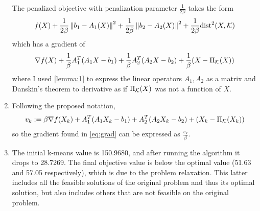 \documentclass{article}
\begin{document}
\begin{enumerate}[label=(\alph*)]
    The penalized objective with penalization parameter $\frac{1}{2\beta}$ takes the form
    \begin{align}
        f(X)+\frac{1}{2\beta}\left\lVert b_1-A_1(X)\right\rVert^2+\frac{1}{2\beta}\left\lVert b_2-A_2(X)\right\rVert^2+\frac{1}{2\beta}\text{dist}^2(X,\mathcal{K})
    \end{align}
    which has a gradient of
    \begin{align}
        \nabla f(X) +\frac{1}{\beta}A_1^T(A_1X -b_1)+\frac{1}{\beta}A_2^T(A_2X-b_2)+\frac{1}{\beta}(X - \Pi_{\mathcal{K}}(X))
        \label{eq:grad}
    \end{align}
    where I used \autoref{lemma:1} to express the linear operators $A_1,A_2$ as a matrix and Danskin's theorem to derivative as if $\Pi_{\mathcal{K}}(X)$ was not a function of $X$.
    \item Following the proposed notation,
    \begin{align}
        v_k := \beta \nabla f(X_k) +A_1^T(A_1X_k -b_1)+A_2^T(A_2X_k-b_2)+(X_k - \Pi_{\mathcal{K}}(X_k))
    \end{align}
    so the gradient found in \eqref{eq:grad} can be expressed as $\frac{v_k}{\beta}$.
    \item The initial k-means value is 150.9680, and after running the algorithm it drops to 28.7269. The final objective value is below the optimal value (51.63 and 57.05 respectively), which is due to the problem relaxation. This latter includes all the feasible solutions of the original problem and thus its optimal solution, but also includes others that are not feasible on the original problem.
\end{enumerate}
\end{document}
